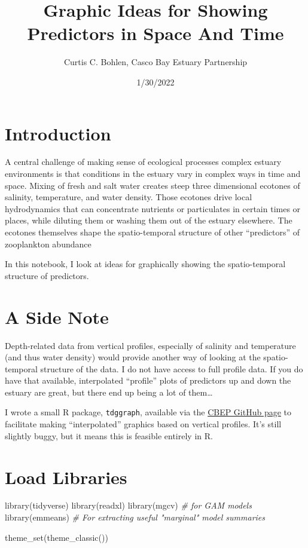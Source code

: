 \documentclass[
]{article}
\title{Graphic Ideas for Showing Predictors in Space And Time}
\author{Curtis C. Bohlen, Casco Bay Estuary Partnership}
\date{1/30/2022}
\newenvironment{Shaded}{\begin{snugshade}}{\end{snugshade}}
\newcommand{\CommentTok}[1]{\textcolor[rgb]{0.56,0.35,0.01}{\textit{#1}}}
\newcommand{\FunctionTok}[1]{\textcolor[rgb]{0.00,0.00,0.00}{#1}}
\newcommand{\NormalTok}[1]{#1}
\begin{document}
\maketitle

{
\setcounter{tocdepth}{3}
\tableofcontents
}
\hypertarget{introduction}{%
\section{Introduction}\label{introduction}}

A central challenge of making sense of ecological processes complex
estuary environments is that conditions in the estuary vary in complex
ways in time and space. Mixing of fresh and salt water creates steep
three dimensional ecotones of salinity, temperature, and water density.
Those ecotones drive local hydrodynamics that can concentrate nutrients
or particulates in certain times or places, while diluting them or
washing them out of the estuary elsewhere. The ecotones themselves shape
the spatio-temporal structure of other ``predictors'' of zooplankton
abundance

In this notebook, I look at ideas for graphically showing the
spatio-temporal structure of predictors.

\hypertarget{a-side-note}{%
\section{A Side Note}\label{a-side-note}}

Depth-related data from vertical profiles, especially of salinity and
temperature (and thus water density) would provide another way of
looking at the spatio-temporal structure of the data. I do not have
access to full profile data. If you do have that available, interpolated
``profile'' plots of predictors up and down the estuary are great, but
there end up being a lot of them\ldots{}

I wrote a small R package, \texttt{tdggraph}, available via the
\href{https://github.com/CBEP-SoCB/tdggraph.git}{CBEP GitHub page} to
facilitate making ``interpolated'' graphics based on vertical profiles.
It's still slightly buggy, but it means this is feasible entirely in R.

\hypertarget{load-libraries}{%
\section{Load Libraries}\label{load-libraries}}

\begin{Shaded}
\begin{Highlighting}[]
\FunctionTok{library}\NormalTok{(tidyverse)}
\FunctionTok{library}\NormalTok{(readxl)}
\FunctionTok{library}\NormalTok{(mgcv)      }\CommentTok{\# for GAM models}
\FunctionTok{library}\NormalTok{(emmeans)   }\CommentTok{\# For extracting useful "marginal" model summaries}

\FunctionTok{theme\_set}\NormalTok{(}\FunctionTok{theme\_classic}\NormalTok{())}
\end{Highlighting}
\end{Shaded}
\end{document}
